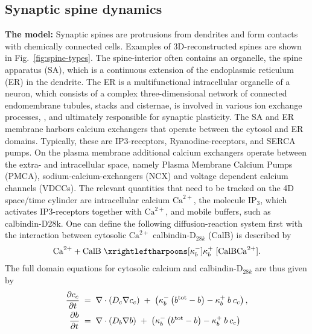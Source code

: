 \subsection{Synaptic spine dynamics} \label{sec:spine-model}
\textbf{The model:} Synaptic spines are protrusions from dendrites and form contacts with chemically connected cells. Examples of 3D-reconstructed spines are shown in Fig.~\ref{fig:spine-types}. The spine-interior often contains an organelle, the spine apparatus (SA), which is a continuous extension of the endoplasmic reticulum (ER) in the dendrite. The ER is a multifunctional intracellular organelle of a neuron,
which consists of a complex three-dimensional network of connected endomembrane
tubules, stacks and cisternae, is involved in various ion exchange processes,
\cite{Breit2018}, and ultimately responsible for synaptic plasticity. The SA and ER membrane harbors calcium exchangers that operate between the cytosol and ER domains. Typically, these are IP3-receptors, Ryanodine-receptors, and SERCA pumps. 
On the plasma membrane additional calcium exchangers operate between the extra- and intracellular space, namely Plasma Membrane Calcium Pumps (PMCA), sodium-calcium-exchangers (NCX) {and voltage dependent calcium channels (VDCCs)}. 
The relevant quantities that need to be tracked on the 4D space/time cylinder are intracellular calcium $\textrm{Ca}^{2+}$, the molecule $\textrm{IP}_3$, which activates IP3-receptors together with $\textrm{Ca}^{2+}$, and mobile buffers, such as calbindin-D28k. One can define the following diffusion-reaction system first with the interaction between cytosolic $\textrm{Ca}^{2+}$ calbindin-$\textrm{D}_{28k}$ (CalB) is described by
\begin{align}
  \mathrm{Ca}^{2+}+\mathrm{CalB}\;\xrightleftharpoons
  [\kappa_{b}^{-}]{\kappa_{b}^{+}}\;[\mathrm{CalBCa}^{2+}].
\end{align}
\noindent The full domain equations for cytosolic calcium and calbindin-$\textrm{D}_{28k}$ are thus given by
\begin{align}
  \frac{\partial c_c}{\partial t} & \;=\; \nabla \cdot \left( D_{c} \nabla c_c \right) \;+\;
    \left(\kappa_{b}^{-}\left(b^{\mathrm{tot}}-b\right)
        -\kappa_{b}^{+}\:b\:c_c\right), \label{eq:ccyt}\\
  \frac{\partial b}{\partial t} & \;=\; \nabla \cdot \left( D_{b} \nabla b \right) \;+\;
    \left(\kappa_{b}^{-}\left(b^{\mathrm{tot}}-b\right)
        -\kappa_{b}^{+}\:b\:c_c\right)  \label{eq:buff}
\end{align}
